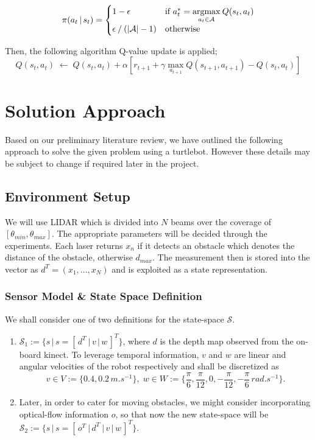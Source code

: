 \documentclass{article}
\newcommand{\argmax}{\operatornamewithlimits{argmax}}
\begin{document}
\begin{equation*}
  \pi(a_t\,\vert\,s_t) =
  \begin{cases}
    1 - \epsilon & \text{if }  a_t^* = \underset{a_t \in  \mathcal{A}}{\argmax}\: Q(s_t, a_t) \\
    \epsilon \mathbin{/} (\abs{\mathcal{A}}-1) & \text{otherwise}
  \end{cases}
\end{equation*}

Then, the following algorithm Q-value update is applied;
\[
Q(s_t,a_t)\;\leftarrow\;Q(s_t,a_t) + \alpha [ r_{t+1} + \gamma \max_{a_{t+1}}
Q(s_{t+1},a_{t+1}) - Q(s_t,a_t) ]
\]

\section{Solution Approach}
Based on our preliminary literature review, we have outlined the following approach to solve the given problem using a turtlebot. However these details may be subject to change if required later in the project.

\subsection{Environment Setup}
We will use LIDAR which is divided into $N$ beams over the coverage of $[\theta_{min}, \theta_{max}]$. The appropriate parameters will be decided through the experiments. Each laser returns $x_n$ if it detects an obstacle which denotes the distance of the obstacle, otherwise $d_{max}$. The measurement then is stored into the vector as $d^T = (x_1,...,x_N)$ and is exploited as a state representation.
\subsubsection{Sensor Model \& State Space Definition}
We shall consider one of two definitions for the state-space $\mathcal{S}$.
\begin{enumerate}
    \item $\mathcal{S}_1 := \big\{ s\,\big\vert \, s= [\,d^T\:\vert\,v\,\vert\,w\,]^T \big\}$, where $d$ is the depth map observed from the on-board kinect. To leverage temporal information, $v$ and $w$ are linear and angular velocities of the robot respectively and shall be discretized as
    \begin{equation*}
      v\in V := \big\{ 0.4, 0.2\,\si{m.s^{-1}}\big\}, \;w\in W:=\big\{ \frac{\pi}{6}, \frac{\pi}{12}, 0, -\frac{\pi}{12}, -\frac{\pi}{6}\,\si{rad.s^{-1}}\big\}.
    \end{equation*}
    \item Later, in order to cater for moving obstacles, we might consider incorporating optical-flow information $o$, so that now the new state-space will be $\mathcal{S}_2 := \big\{ s\,\big\vert \, s = [\,o^T\:\vert\,d^T\:\vert\,v\,\vert\,w\,]^T \big\}$.
\end{enumerate}
\end{document}
